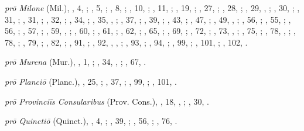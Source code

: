 \begin{autindex}
  \subitem \emph{prō Milone} (Mil.),
    ,   4, ;
    ,   5, ;
    ,   8, ;
    ,  10, ;
    ,  11, ;
    ,  19, ;
    ,  27, ;
    ,  28, ;
    ,  29, , ;
    ,  30, ;
    ,  31, ;
    ,  31, ;
    ,  32, ;
    ,  34, ;
    ,  35, , ;
    ,  37, ;
    ,  39, ;
    ,  43, ;
    ,  47, ;
    ,  49, , ;
    ,  56, ;
    ,  55, ;
    ,  56, ;
    ,  57, ;
    ,  59, , ;
    ,  60, ;
    ,  61, ;
    ,  62, ;
    ,  65, ;
    ,  69, ;
    ,  72, ;
    ,  73, , ;
    ,  75, ;
    ,  78, , ;
    ,  78, ;
    ,  79, ;
    ,  82, ;
    ,  91, ;
    ,  92, , , ;
    ,  93, ;
    ,  94, ;
    ,  99, ;
    , 101, ;
    , 102, .

  \subitem \emph{prō Murena} (Mur.),
    ,  1, ;
    , 34, , ;
    , 67, .

  \subitem \emph{prō Planciō} (Planc.),
    ,  25, ;
    ,  37, ;
    ,  99, ;
    , 101, .

  \subitem \emph{prō Provinciīs Consularibus} (Prov. Cons.),
    , 18, , ;
    , 30, .

  \subitem \emph{prō Quinctiō} (Quinct.),
    ,  4, ;
    , 39, ;
    , 56, ;
    , 76, .


\end{autindex}
